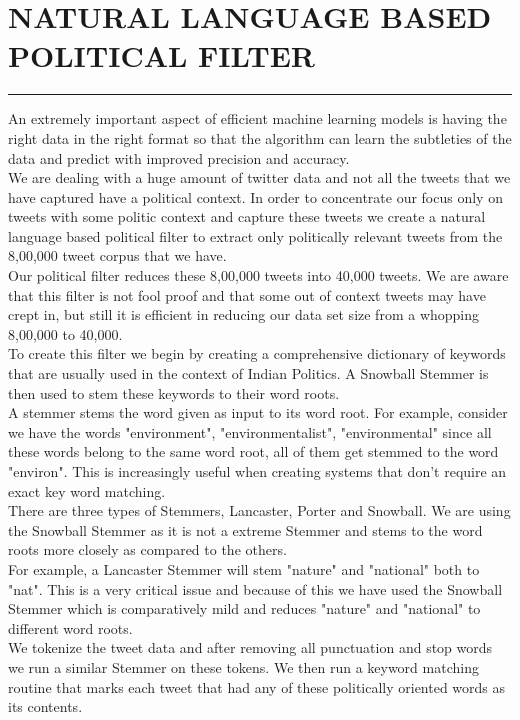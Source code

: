 \documentclass[a4paper,11pt]{article}
\begin{document}
\section{NATURAL LANGUAGE BASED POLITICAL FILTER}
\hrule
\vspace*{5mm}
An extremely important aspect of efficient machine learning models is having the right data in the right format so that the algorithm can learn the subtleties of the data and predict with improved precision and accuracy.
\medskip\\
We are dealing with a huge amount of twitter data and not all the tweets that we have captured have a political context.
In order to concentrate our focus only on tweets with some politic context and capture these tweets we create a natural language based political filter to extract only politically relevant tweets from the 8,00,000 tweet corpus that we have.
\medskip\\
Our political filter reduces these 8,00,000 tweets into 40,000 tweets. We are aware that this filter is not fool proof and that some out of context tweets may have crept in, but still it is efficient in reducing our data set size from a whopping 8,00,000 to 40,000.
\medskip\\
To create this filter we begin by creating a comprehensive dictionary of keywords that are usually used in the context of Indian Politics. A Snowball Stemmer is then used to stem these keywords to their word roots. 
\medskip\\
A stemmer stems the word given as input to its word root. For example, consider we have the words "environment", "environmentalist", "environmental" since all these words belong to the same word root, all of them get stemmed to the word "environ". This is increasingly useful when creating systems that don't require an exact key word matching.
\medskip\\
There are three types of Stemmers, Lancaster, Porter and Snowball. We are using the Snowball Stemmer as it is not a extreme Stemmer and stems to the word roots more closely as compared to the others. 
\medskip\\
For example, a Lancaster Stemmer will stem "nature" and "national" both to "nat". This is a very critical issue and because of this we have used the Snowball Stemmer which is comparatively mild and reduces "nature" and "national" to different word roots.
\medskip\\
We tokenize the tweet data and after removing all punctuation and stop words we run a similar Stemmer on these tokens. We then run a keyword matching routine that marks each tweet that had any of these politically oriented words as its contents.
\end{document}
